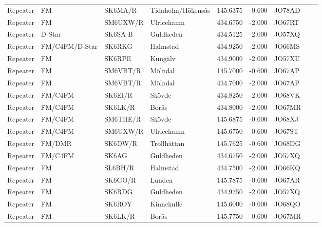 \begin{longtable}{llllrrlcl}
	Repeater & FM              & SK6MA/R  & Tidaholm/Hökensås     &   145.6375 &   -0.600 & JO78AD &  &  \\
	Repeater & FM              & SM6UXW/R & Ulricehamn            &   434.6750 &   -2.000 & JO67RT &  &  \\
	Repeater & D-Star          & SK6SA-B  & Guldheden             &   434.5125 &   -2.000 & JO57XQ &  &  \\
	Repeater & FM/C4FM/D-Star  & SK6RKG   & Halmstad              &   434.9250 &   -2.000 & JO66MS &  &  \\
	Repeater & FM              & SK6RPE   & Kungälv               &   434.9000 &   -2.000 & JO57XU &  &  \\
	Repeater & FM              & SM6VBT/R & Mölndal               &   145.7000 &   -0.600 & JO67AP &  &  \\
	Repeater & FM              & SM6VBT/R & Mölndal               &   434.7000 &   -2.000 & JO67AP &  &  \\
	Repeater & FM/C4FM         & SK6EI/R  & Skövde                &   434.8250 &   -2.000 & JO68VK &  &  \\
	Repeater & FM/C4FM         & SK6LK/R  & Borås                 &   434.8000 &   -2.000 & JO67MR &  &  \\
	Repeater & FM/C4FM         & SM6THE/R & Skövde                &   145.6875 &   -0.600 & JO68XJ &  &  \\
	Repeater & FM/C4FM         & SM6UXW/R & Ulricehamn            &   145.6750 &   -0.600 & JO67ST &  &  \\
	Repeater & FM/DMR          & SK6DW/R  & Trollhättan           &   145.7625 &   -0.600 & JO68DG &  &  \\
	Repeater & FM/C4FM         & SK6AG    & Guldheden             &   434.6750 &   -2.000 & JO57XQ &  &  \\
	Repeater & FM              & SL6BH/R  & Halmstad              &   434.7500 &   -2.000 & JO66KQ &  &  \\
	Repeater & FM              & SK6GO/R  & Lunden                &   145.7875 &   -0.600 & JO67AR &  &  \\
	Repeater & FM              & SK6RDG   & Guldheden             &   434.9750 &   -2.000 & JO57XQ &  &  \\
	Repeater & FM              & SK6ROY   & Kinnekulle            &   145.6000 &   -0.600 & JO68QO &  &  \\
	Repeater & FM              & SK6LK/R  & Borås                 &   145.7750 &   -0.600 & JO67MR &  &  \\

\end{longtable}
